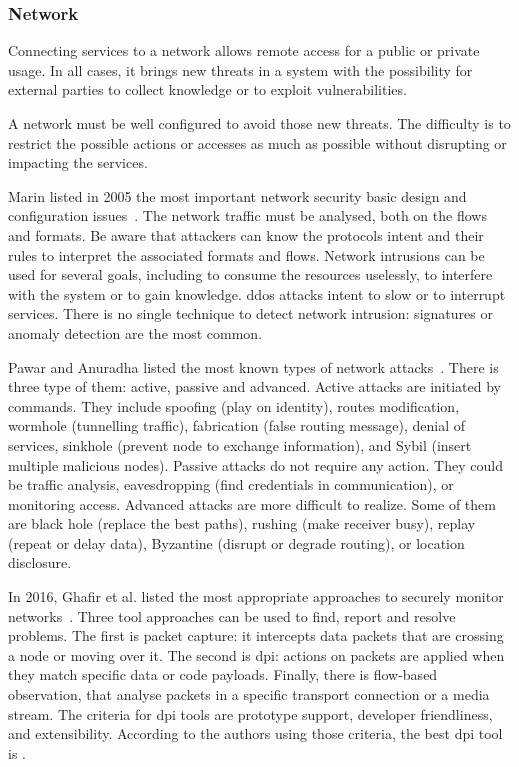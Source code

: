 \subsubsection{Network}
\label{subsubsec:state_review_results_network}

Connecting services to a network allows remote access for a public or private usage. In all cases, it brings new threats in a system with the possibility for external parties to collect knowledge or to exploit vulnerabilities.

A network must be well configured to avoid those new threats. The difficulty is to restrict the possible actions or accesses as much as possible without disrupting or impacting the services.

Marin listed in 2005 the most important network security basic design and configuration issues~\cite{marin_network_2005}. The network traffic must be analysed, both on the flows and formats. Be aware that attackers can know the protocols intent and their rules to interpret the associated formats and flows. Network intrusions can be used for several goals, including to consume the resources uselessly, to interfere with the system or to gain knowledge. \gls{ddos} attacks intent to slow or to interrupt services. There is no single technique to detect network intrusion: signatures or anomaly detection are the most common. %

Pawar and Anuradha listed the most known types of network attacks~\cite{pawar_network_2015}. There is three type of them: active, passive and advanced. Active attacks are initiated by commands. They include spoofing (play on identity), routes modification, wormhole (tunnelling traffic), fabrication (false routing message), denial of services, sinkhole (prevent node to exchange information), and Sybil (insert multiple malicious nodes). Passive attacks do not require any action. They could be traffic analysis, eavesdropping (find credentials in communication), or monitoring access. Advanced attacks are more difficult to realize. Some of them are black hole (replace the best paths), rushing (make receiver busy), replay (repeat or delay data), Byzantine (disrupt or degrade routing), or location disclosure. %

In 2016, Ghafir et al. listed the most appropriate approaches to securely monitor networks~\cite{ghafir_survey_2016}. Three tool approaches can be used to find, report and resolve problems. The first is packet capture: it intercepts data packets that are crossing a node or moving over it. The second is \gls{dpi}: actions on packets are applied when they match specific data or code payloads. Finally, there is flow-based observation, that analyse packets in a specific transport connection or a media stream. The criteria for \gls{dpi} tools are prototype support, developer friendliness, and extensibility. According to the authors using those criteria, the best \gls{dpi} tool is . %


